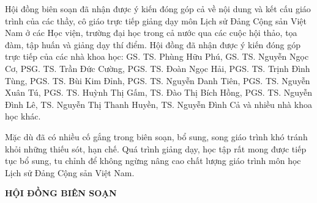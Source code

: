 Hội đồng biên soạn đã nhận được ý kiến đóng góp cả về nội dung và kết cấu giáo trình của các thầy, cô giáo trực tiếp giảng dạy môn Lịch sử Đảng Cộng sản Việt Nam ở các Học viện, trường đại học trong cả nước qua các cuộc hội thảo, tọa đàm, tập huấn và giảng dạy thí điểm. Hội đồng đã nhận được ý kiến đóng góp trực tiếp của các nhà khoa học: GS. TS. Phùng Hữu Phú, GS. TS. Nguyễn Ngọc Cơ, PSG. TS. Trần Đức Cường, PGS. TS. Đoàn Ngọc Hải, PGS. TS. Trịnh Đình Tùng, PGS. TS. Bùi Kim Đỉnh, PGS. TS. Nguyễn Danh Tiên, PGS. TS. Nguyễn Xuân Tú, PGS. TS. Huỳnh Thị Gấm, TS. Đào Thị Bích Hồng, PGS. TS. Nguyễn Đình Lê, TS. Nguyễn Thị Thanh Huyền, TS. Nguyễn Đình Cả và nhiều nhà khoa học khác.

Mặc dù đã có nhiều cố gắng trong biên soạn, bổ sung, song giáo trình khó tránh khỏi những thiếu sót, hạn chế. Quá trình giảng dạy, học tập rất mong được tiếp tục bổ sung, tu chỉnh để không ngừng nâng cao chất lượng giáo trình môn học Lịch sử Đảng Cộng sản Việt Nam.

\begin{flushright}
\textbf{HỘI ĐỒNG BIÊN SOẠN}
\end{flushright}